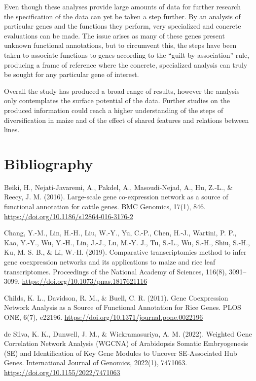 \documentclass[
]{article}
\begin{document}
Even though these analyses provide large amounts of data for further
research the specification of the data can yet be taken a step further.
By an analysis of particular genes and the functions they perform, very
specialized and concrete evaluations can be made. The issue arises as
many of these genes present unknown functional annotations, but to
circumvent this, the steps have been taken to associate functions to
genes according to the ``guilt-by-association'' rule, producing a frame
of reference where the concrete, specialized analysis can truly be
sought for any particular gene of interest.

Overall the study has produced a broad range of results, however the
analysis only contemplates the surface potential of the data. Further
studies on the produced information could reach a higher understanding
of the steps of diversification in maize and of the effect of shared
features and relations between lines.

\hypertarget{bibliography}{%
\section{Bibliography}\label{bibliography}}

Beiki, H., Nejati-Javaremi, A., Pakdel, A., Masoudi-Nejad, A., Hu,
Z.-L., \& Reecy, J. M. (2016). Large-scale gene co-expression network as
a source of functional annotation for cattle genes. BMC Genomics, 17(1),
846.
\href{https://doi.org/10.1186/s12864-016-3176-2}{{https://doi.org/10.1186/s12864-016-3176-2}}

Chang, Y.-M., Lin, H.-H., Liu, W.-Y., Yu, C.-P., Chen, H.-J., Wartini,
P. P., Kao, Y.-Y., Wu, Y.-H., Lin, J.-J., Lu, M.-Y. J., Tu, S.-L., Wu,
S.-H., Shiu, S.-H., Ku, M. S. B., \& Li, W.-H. (2019). Comparative
transcriptomics method to infer gene coexpression networks and its
applications to maize and rice leaf transcriptomes. Proceedings of the
National Academy of Sciences, 116(8), 3091--3099.
\href{https://doi.org/10.1073/pnas.1817621116}{{https://doi.org/10.1073/pnas.1817621116}}

Childs, K. L., Davidson, R. M., \& Buell, C. R. (2011). Gene
Coexpression Network Analysis as a Source of Functional Annotation for
Rice Genes. PLOS ONE, 6(7), e22196.
\href{https://doi.org/10.1371/journal.pone.0022196}{{https://doi.org/10.1371/journal.pone.0022196}}

de Silva, K. K., Dunwell, J. M., \& Wickramasuriya, A. M. (2022).
Weighted Gene Correlation Network Analysis (WGCNA) of Arabidopsis
Somatic Embryogenesis (SE) and Identification of Key Gene Modules to
Uncover SE-Associated Hub Genes. International Journal of Genomics,
2022(1), 7471063.
\href{https://doi.org/10.1155/2022/7471063}{{https://doi.org/10.1155/2022/7471063}}
\end{document}
